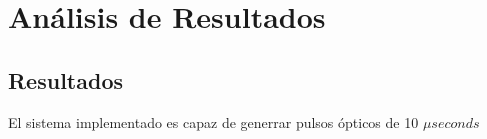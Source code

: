 \chapter{Análisis de Resultados}
\section{Resultados}
El sistema implementado es capaz de generrar pulsos ópticos de 10 $\mu \si{seconds}$